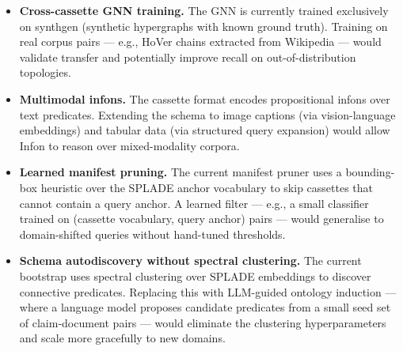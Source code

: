 \begin{itemize}
  \item \textbf{Cross-cassette GNN training.}  The GNN is currently trained
    exclusively on synthgen (synthetic hypergraphs with known ground truth).
    Training on real corpus pairs — e.g., HoVer chains extracted from
    Wikipedia — would validate transfer and potentially improve recall on
    out-of-distribution topologies.

  \item \textbf{Multimodal infons.}  The cassette format encodes
    propositional infons over text predicates.  Extending the schema to
    image captions (via vision-language embeddings) and tabular data
    (via structured query expansion) would allow Infon to reason over
    mixed-modality corpora.

  \item \textbf{Learned manifest pruning.}  The current manifest pruner
    uses a bounding-box heuristic over the SPLADE anchor vocabulary to skip
    cassettes that cannot contain a query anchor.  A learned filter —
    e.g., a small classifier trained on (cassette vocabulary, query anchor)
    pairs — would generalise to domain-shifted queries without hand-tuned
    thresholds.

  \item \textbf{Schema autodiscovery without spectral clustering.}  The
    current bootstrap uses spectral clustering over SPLADE embeddings to
    discover connective predicates.  Replacing this with LLM-guided
    ontology induction — where a language model proposes candidate
    predicates from a small seed set of claim-document pairs — would
    eliminate the clustering hyperparameters and scale more gracefully to
    new domains.
\end{itemize}
